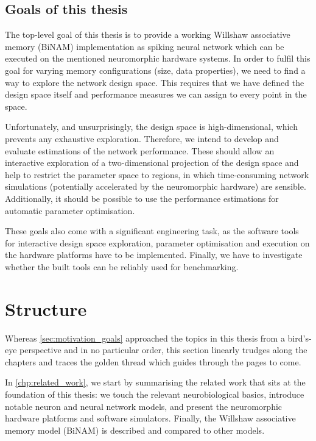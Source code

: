 \subsection{Goals of this thesis}

The top-level goal of this thesis is to provide a working Willshaw associative memory (\acrshort{BiNAM}) implementation as spiking neural network which can be executed on the mentioned neuromorphic hardware systems. In order to fulfil this goal for varying memory configurations (\eg size, data properties), we need to find a way to explore the network design space. This requires that we have defined the design space itself and performance measures we can assign to every point in the space.

Unfortunately, and unsurprisingly, the design space is high-di\-men\-sion\-al, which prevents any exhaustive exploration. Therefore, we intend to develop and evaluate estimations of the network performance. These should allow an interactive exploration of a two-dimensional projection of the design space and help to restrict the parameter space to regions, in which time-consuming network simulations (potentially accelerated by the neuromorphic hardware) are sensible. Additionally, it should be possible to use the performance estimations for automatic parameter optimisation.

These goals also come with a significant engineering task, as the software tools for interactive design space exploration, parameter optimisation and execution on the hardware platforms have to be implemented. Finally, we have to investigate whether the built tools can be reliably used for benchmarking.

\section{Structure}
\label{sec:structure}

Whereas \cref{sec:motivation_goals} approached the topics in this thesis from a bird's-eye perspective and in no particular order, this section linearly trudges along the chapters and traces the golden thread which guides through the pages to come.

In \cref{chp:related_work}, we start by summarising the related work that sits at the foundation of this thesis: we touch the relevant neurobiological basics, introduce notable neuron and neural network models, and present the neuromorphic hardware platforms and software simulators. Finally, the Willshaw associative memory model (\acrshort{BiNAM}) is described and compared to other models.

